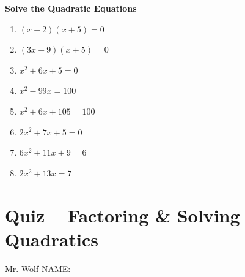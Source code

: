 \documentclass[11pt]{article}
\begin{document}
\pagebreak

\textbf{Solve the Quadratic Equations} 

\begin{enumerate}[resume]

\item $(x-2)(x+5)=0$\\

	\vspace{1cm}
	
\item $(3x-9)(x+5)=0$\\

	\vspace{1cm}

\item $x^2+6x+5=0$\\

	\vspace{1cm}

\item $x^2-99x=100$\\

	\vspace{1cm}

\item $x^2+6x+105=100$\\

	\vspace{1cm}

\item $2x^2+7x+5=0$\\

	\vspace{1cm}

\item $6x^2+11x+9=6$\\

	\vspace{1cm}

\item $2x^2+13x=7$\\
\end{enumerate}

\pagebreak

\section*{Quiz  -- Factoring \& Solving Quadratics}

Mr. Wolf \hfill NAME:\underline{\hspace{3in}}\\ 
\end{document}
